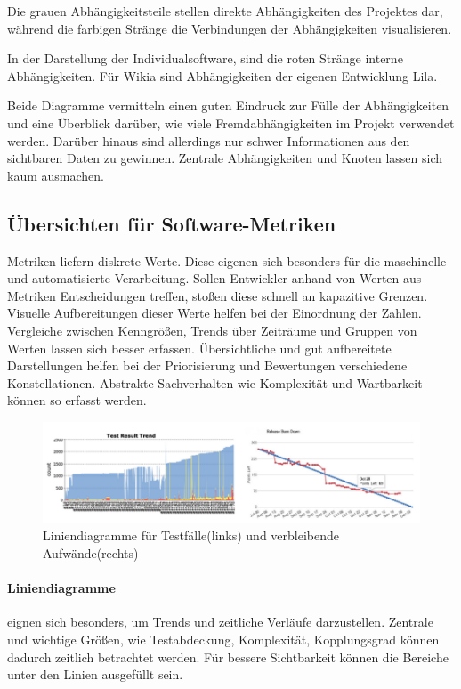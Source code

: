 Die grauen Abhängigkeitsteile stellen direkte Abhängigkeiten des Projektes dar, während die farbigen Stränge die Verbindungen der Abhängigkeiten visualisieren.

In der Darstellung der Individualsoftware, sind die roten Stränge interne Abhängigkeiten. Für Wikia sind Abhängigkeiten der eigenen Entwicklung Lila.

Beide Diagramme vermitteln einen guten Eindruck zur Fülle der Abhängigkeiten und eine Überblick darüber, wie viele Fremdabhängigkeiten im Projekt verwendet werden. Darüber hinaus sind allerdings nur schwer Informationen aus den sichtbaren Daten zu gewinnen. Zentrale Abhängigkeiten und Knoten lassen sich kaum ausmachen.

\subsection{Übersichten für Software-Metriken}

Metriken liefern diskrete Werte. Diese eigenen sich besonders für die maschinelle und automatisierte Verarbeitung. Sollen Entwickler anhand von Werten aus Metriken Entscheidungen treffen, stoßen diese schnell an kapazitive Grenzen. Visuelle Aufbereitungen dieser Werte helfen bei der Einordnung der Zahlen. Vergleiche zwischen Kenngrößen, Trends über Zeiträume und Gruppen von Werten lassen sich besser erfassen. Übersichtliche und gut aufbereitete Darstellungen helfen bei der Priorisierung und Bewertungen verschiedene Konstellationen. Abstrakte Sachverhalten wie Komplexität und Wartbarkeit können so erfasst werden.

\begin{figure}[htbp]
  \includegraphics[width=\textwidth, height=\textheight, keepaspectratio]
    {resources/line-chart.pdf}
  \caption{Liniendiagramme für Testfälle(links) und verbleibende Aufwände(rechts)}
  \label{line-chart}
\end{figure}
\paragraph{Liniendiagramme} eignen sich besonders, um Trends und zeitliche Verläufe darzustellen. Zentrale und wichtige Größen, wie Testabdeckung, Komplexität, Kopplungsgrad können dadurch zeitlich betrachtet werden. Für bessere Sichtbarkeit können die Bereiche unter den Linien ausgefüllt sein.

